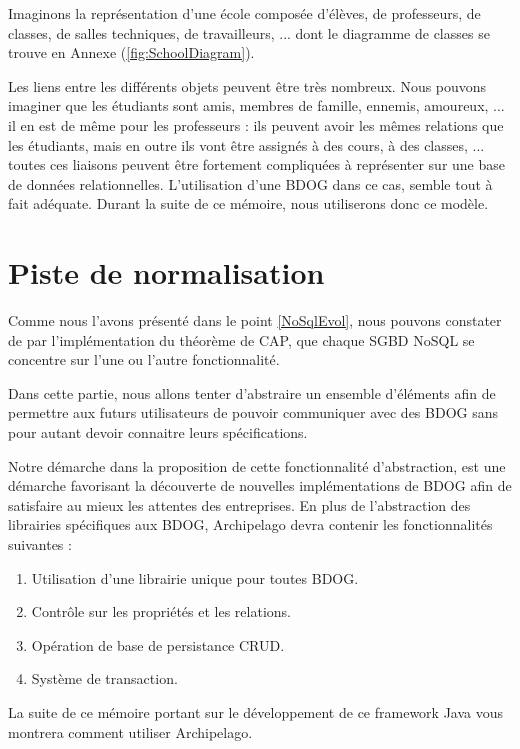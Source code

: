 \documentclass[a4paper,fleqn,12pt,oneside]{report}
\begin{document}
Imaginons la représentation d'une école composée d'élèves, de professeurs, de classes, de salles techniques, de travailleurs, ... dont le diagramme de classes se trouve en Annexe (\ref{fig:SchoolDiagram}).

Les liens entre les différents objets peuvent être très nombreux. Nous pouvons imaginer que les étudiants sont amis, membres de famille, ennemis, amoureux, ... il en est de même pour les professeurs : ils peuvent avoir les mêmes relations que les étudiants, mais en outre ils vont être assignés à des cours, à des classes, ... toutes ces liaisons peuvent être fortement compliquées à représenter sur une base de données relationnelles. L'utilisation d'une BDOG dans ce cas, semble tout à fait adéquate. Durant la suite de ce mémoire, nous utiliserons donc ce modèle.



\section{Piste de normalisation} 
Comme nous l'avons présenté dans le point \ref{NoSqlEvol}, nous pouvons constater de par l'implémentation du théorème de CAP, que chaque SGBD NoSQL se concentre sur l'une ou l'autre fonctionnalité. 

Dans cette partie, nous allons tenter d'abstraire un ensemble d'éléments afin de permettre aux futurs utilisateurs de pouvoir communiquer avec des BDOG sans pour autant devoir connaitre leurs spécifications. 

Notre démarche dans la proposition de cette fonctionnalité d'abstraction, est une démarche favorisant la découverte de nouvelles implémentations de BDOG afin de satisfaire au mieux les attentes des entreprises. En plus de l'abstraction des librairies spécifiques aux BDOG, Archipelago devra contenir les fonctionnalités suivantes :
 
\begin{enumerate}
\item Utilisation d'une librairie unique pour toutes BDOG.
\item Contrôle sur les propriétés et les relations.
\item Opération de base de persistance CRUD.
\item Système de transaction.
\end{enumerate}

La suite de ce mémoire portant sur le développement de ce framework Java vous montrera comment utiliser Archipelago.
\end{document}
